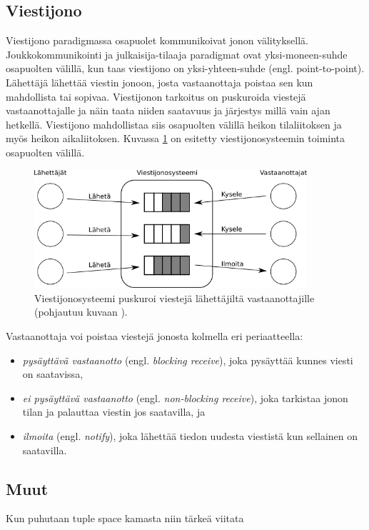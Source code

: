 \subsection{Viestijono}
Viestijono paradigmassa osapuolet kommunikoivat jonon välityksellä. Joukkokommunikointi ja julkaisija-tilaaja paradigmat ovat yksi-moneen-suhde osapuolten välillä, kun taas viestijono on yksi-yhteen-suhde (engl. point-to-point). Lähettäjä lähettää viestin jonoon, josta vastaanottaja poistaa sen kun mahdollista tai sopivaa. Viestijonon tarkoitus on puskuroida viestejä vastaanottajalle ja näin taata niiden saatavuus ja järjestys millä vain ajan hetkellä. Viestijono mahdollistaa siis osapuolten välillä heikon tilaliitoksen ja myös heikon aikaliitoksen. Kuvassa \ref{fig:message-queue-communication} on esitetty viestijonosysteemin toiminta osapuolten välillä.

\begin{figure}[ht!]
	\includegraphics[width=0.9\textwidth]{pictures/message-queue.png}
	\caption{Viestijonosysteemi puskuroi viestejä lähettäjiltä vastaanottajille (pohjautuu kuvaan \mbox{\cite[s.~255]{distributed-systems-concepts-and-design}}).}
	\label{fig:message-queue-communication}
\end{figure}

Vastaanottaja voi poistaa viestejä jonosta kolmella eri periaatteella:
\begin{itemize}
	\item \emph{pysäyttävä vastaanotto} (engl. \emph{blocking receive}), joka pysäyttää kunnes viesti on saatavissa,
	\item \emph{ei pysäyttävä vastaanotto} (engl. \emph{non-blocking receive}), joka tarkistaa jonon tilan ja palauttaa viestin jos saatavilla, ja
	\item \emph{ilmoita} (engl. \emph{notify}), joka lähettää tiedon uudesta viestistä kun sellainen on saatavilla.
\end{itemize}



\subsection{Muut}
Kun puhutaan tuple space kamasta niin tärkeä viitata \cite{generative-communication-in-linda}



